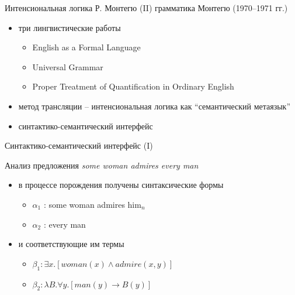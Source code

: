 \documentclass{beamer}
\begin{document}
\begin{frame}{Интенсиональная логика Р. Монтегю (II)}
грамматика Монтегю (1970--1971 гг.)\\
\bigskip
\begin{itemize}
    \item три лингвистические работы
    \begin{itemize}
        \item English as a Formal Language
        \item Universal Grammar
        \item Proper Treatment of Quantification in Ordinary English
    \end{itemize}
    \item метод трансляции -- интенсиональная логика как ``семантический метаязык''
    \item синтактико-семантический интерфейс
\end{itemize}
\end{frame}

\begin{frame}{Синтактико-семантический интерфейс (I)}
\begin{small}
Анализ предложения \textit{some woman admires every man}\\
\begin{itemize}
	\item в процессе порождения получены синтаксические формы
	\begin{itemize}
		\item $\alpha_1$ : some woman admires him$_n$
		\item $\alpha_2$ : every man
	\end{itemize}
	\item и соответствующие им термы 
	\begin{itemize}
		\item $\beta_1 : \exists x . [woman(x) \wedge admire(x,y)]$
		\item $\beta_2 : \lambda B . \forall y . [man(y) \to B(y)]$
	\end{itemize}
\end{itemize}
\end{small}
\end{frame}
\end{document}
